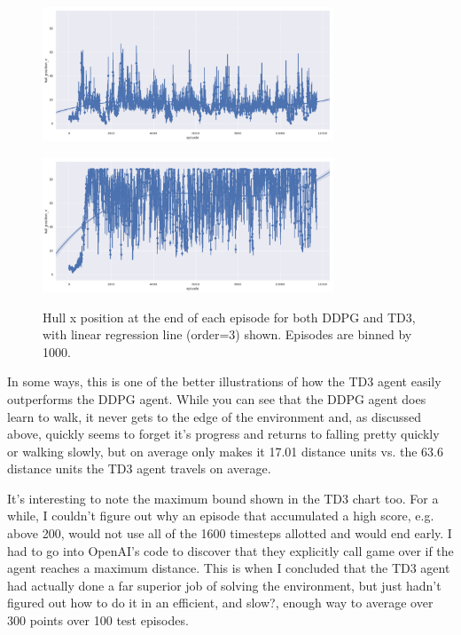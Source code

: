 \documentclass{article}
\begin{document}
\begin{figure}[h]
\caption{Hull x position at the end of each episode for both DDPG and TD3, with linear regression line (order=3) shown. Episodes are binned by 1000.}
\centering

\begin{minipage}[t]{.5\linewidth}
\centering
\includegraphics[width=\linewidth, height=4cm]{images/hull_position_x_ddpg.png}
\label{fig:a}
\end{minipage}%
\begin{minipage}[t]{.5\linewidth}
\centering
\includegraphics[width=\linewidth, height=4cm]{images/hull_position_x_td3.png}
\label{fig:b}
\end{minipage}
\label{fig:hull_positions}
\end{figure}

In some ways, this is one of the better illustrations of how the TD3 agent easily outperforms the DDPG agent. While you can see that the DDPG agent does learn to walk, it never gets to the edge of the environment and, as discussed above, quickly seems to forget it's progress and returns to falling pretty quickly or walking slowly, but on average only makes it 17.01 distance units vs. the 63.6 distance units the TD3 agent travels on average.

It's interesting to note the maximum bound shown in the TD3 chart too. For a while, I couldn't figure out why an episode that accumulated a high score, e.g. above 200, would not use all of the 1600 timesteps allotted and would end early. I had to go into OpenAI's code to discover that they explicitly call game over if the agent reaches a maximum distance. This is when I concluded that the TD3 agent had actually done a far superior job of solving the environment, but just hadn't figured out how to do it in an efficient, and slow?, enough way to average over 300 points over 100 test episodes. 
\end{document}
